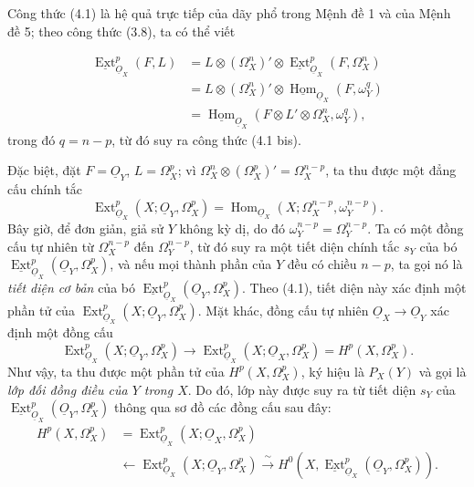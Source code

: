 \documentclass[11pt,twoside,openany]{book}
\numberwithin{equation}{section}
\newcommand{\src}[1]{%
  \phantomsection\hypertarget{src:\fgasourceid:#1}{}%
  \marginpar{\raggedleft\footnotesize\sffamily #1}%
}
\newcommand{\fgasourceid}{unset}
\newcommand{\Osh}{\underline{O}}
\newcommand{\Homsh}{\underline{\operatorname{Hom}}}
\newcommand{\Extsh}{\underline{\operatorname{Ext}}}
\begin{document}
Công thức (4.1) là hệ quả trực tiếp của dãy phổ trong
Mệnh đề 1 và của Mệnh đề 5; theo công thức (3.8), ta có thể
viết


\src{178}
\begin{align*}
\Extsh_{\Osh_X}^{p}(F,L)
&=L\otimes(\Omega_X^{n})'\otimes
  \Extsh_{\Osh_X}^{p}(F,\Omega_X^{n})\\
&=L\otimes(\Omega_X^{n})'\otimes
  \Homsh_{\Osh_X}(F,\omega_Y^{q})\\
&=\Homsh_{\Osh_X}\!\left(
  F\otimes L'\otimes\Omega_X^{n},\omega_Y^{q}\right),
\end{align*}
trong đó $q=n-p$, từ đó suy ra công thức (4.1 bis).

Đặc biệt, đặt $F=\Osh_Y$, $L=\Omega_X^{p}$; vì
$\Omega_X^{n}\otimes(\Omega_X^{p})'=\Omega_X^{n-p}$, ta thu được một đẳng cấu
chính tắc
\begin{equation}\tag{4.2}
  \operatorname{Ext}_{\Osh_X}^{p}(X;\Osh_Y,\Omega_X^{p})
  =\operatorname{Hom}_{\Osh_X}
  (X;\Omega_X^{n-p},\omega_Y^{n-p}).
\end{equation}
Bây giờ, để đơn giản, giả sử $Y$ không kỳ dị, do đó
$\omega_Y^{n-p}=\Omega_Y^{n-p}$. Ta có một đồng cấu tự nhiên từ
$\Omega_X^{n-p}$ đến $\Omega_Y^{n-p}$, từ đó suy ra một tiết diện chính tắc $s_Y$ của
bó $\Extsh_{\Osh_X}^{p}(\Osh_Y,\Omega_X^{p})$, và nếu
mọi thành phần của $Y$ đều có chiều $n-p$, ta gọi nó là \emph{tiết diện
cơ bản} của bó $\Extsh_{\Osh_X}^{p}(\Osh_Y,\Omega_X^{p})$. Theo (4.1), tiết diện
này xác định một phần tử của
$\operatorname{Ext}_{\Osh_X}^{p}(X;\Osh_Y,\Omega_X^{p})$. Mặt khác, đồng cấu
tự nhiên $\Osh_X\longrightarrow\Osh_Y$ xác định một đồng cấu
\[
  \operatorname{Ext}_{\Osh_X}^{p}(X;\Osh_Y,\Omega_X^{p})
  \longrightarrow
  \operatorname{Ext}_{\Osh_X}^{p}(X;\Osh_X,\Omega_X^{p})
  =H^{p}(X,\Omega_X^{p}).
\]
Như vậy, ta thu được một phần tử của $H^{p}(X,\Omega_X^{p})$, ký hiệu là $P_X(Y)$ và gọi là
\emph{lớp đối đồng điều của $Y$ trong $X$}. Do đó, lớp này được suy ra từ tiết diện
$s_Y$ của $\Extsh_{\Osh_X}^{p}(\Osh_Y,\Omega_X^{p})$ thông qua sơ đồ
các đồng cấu sau đây:
\begin{equation}\tag{4.3}
\begin{aligned}
H^{p}(X,\Omega_X^{p})
&=\operatorname{Ext}_{\Osh_X}^{p}(X;\Osh_X,\Omega_X^{p})\\
&\longleftarrow\operatorname{Ext}_{\Osh_X}^{p}(X;\Osh_Y,\Omega_X^{p})
\xrightarrow{\ \sim\ }
H^{0}\!\left(X,\Extsh_{\Osh_X}^{p}(\Osh_Y,\Omega_X^{p})\right).
\end{aligned}
\end{equation}
\end{document}
